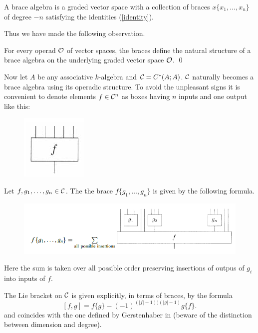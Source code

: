 \documentclass[TFM.tex]{subfiles}
\begin{document}
\begin{defi}
A brace algebra is a graded vector space with a collection of braces
$x\{x_1,\dots , x_n\}$ of degree $−n$ satisfying the identities (\ref{identity}).
\end{defi}

Thus we have made the following observation.

\begin{prop}
For every operad ${\mathcal O}$ of vector spaces, the braces define the natural
structure of a brace algebra on the underlying graded vector space ${\mathcal O}$. \qed
\end{prop}

Now let $A$ be any associative $k$-algebra and $\mathcal{C}=C^*(A;A)$. $\mathcal{C}$ naturally becomes a brace algebra using its operadic structure. To avoid the unpleasant signs it is convenient to denote elements $f \in \mathcal{C}^n$ as boxes having $n$ inputs and one output like this:

\begin{figure}[h!]
\includegraphics[scale=0.8]{Imagenes//box}
\end{figure}



Let $f,g_1,\dots, g_n\in \mathcal{C}$. The the brace $f\{g_1,\dots, g_n\}$ is given by the following formula.\\

\begin{figure}[h!]
\includegraphics[scale=0.7]{Imagenes//brace}
\end{figure}

Here the sum is taken over all possible order preserving insertions of outpus of $g_i$ into
inputs of $f$.




The Lie bracket on $\mathcal{C}$ is given explicitly, in terms of braces, by the formula %
\[
[f,g]=f\{g\}-(-1)^{(|f|-1))(|g|-1)}g\{f\}.
\]
and coincides with the one defined by Gerstenhaber in \cite{GH} (beware of the distinction between dimension and degree).
\end{document}
